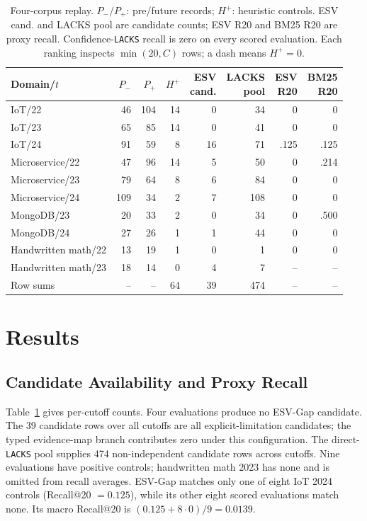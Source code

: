 \documentclass[conference,a4paper]{IEEEtran}
\begin{document}
\begin{table}[t]
\caption{Four-corpus replay. $P_-/P_+$: pre/future records; $H^+$: heuristic controls. ESV cand. and LACKS pool are candidate counts; ESV R20 and BM25 R20 are proxy recall. Confidence-\texttt{LACKS} recall is zero on every scored evaluation. Each ranking inspects $\min(20,C)$ rows; a dash means $H^+=0$.}
\label{tab:folds}
\centering\scriptsize\setlength{\tabcolsep}{2.2pt}
\begin{tabular}{lrrrrrrr}
\toprule
Domain/$t$ & $P_-$ & $P_+$ & $H^+$ & \shortstack{ESV\\cand.} & \shortstack{LACKS\\pool} & \shortstack{ESV\\R20} & \shortstack{BM25\\R20} \\
\midrule
IoT/22 & 46 & 104 & 14 & 0 & 34 & 0 & 0 \\
IoT/23 & 65 & 85 & 14 & 0 & 41 & 0 & 0 \\
IoT/24 & 91 & 59 & 8 & 16 & 71 & .125 & .125 \\
Microservice/22 & 47 & 96 & 14 & 5 & 50 & 0 & .214 \\
Microservice/23 & 79 & 64 & 8 & 6 & 84 & 0 & 0 \\
Microservice/24 & 109 & 34 & 2 & 7 & 108 & 0 & 0 \\
MongoDB/23 & 20 & 33 & 2 & 0 & 34 & 0 & .500 \\
MongoDB/24 & 27 & 26 & 1 & 1 & 44 & 0 & 0 \\
Handwritten math/22 & 13 & 19 & 1 & 0 & 1 & 0 & 0 \\
Handwritten math/23 & 18 & 14 & 0 & 4 & 7 & -- & -- \\
\midrule
Row sums & -- & -- & 64 & 39 & 474 & -- & -- \\
\bottomrule
\end{tabular}
\end{table}

\section{Results}
\subsection{Candidate Availability and Proxy Recall}
Table~\ref{tab:folds} gives per-cutoff counts. Four evaluations produce no ESV-Gap candidate. The 39 candidate rows over all cutoffs are all explicit-limitation candidates; the typed evidence-map branch contributes zero under this configuration. The direct-\texttt{LACKS} pool supplies 474 non-independent candidate rows across cutoffs. Nine evaluations have positive controls; handwritten math 2023 has none and is omitted from recall averages. ESV-Gap matches only one of eight IoT 2024 controls (Recall@20 $=0.125$), while its other eight scored evaluations match none. Its macro Recall@20 is $(0.125+8\cdot0)/9=0.0139$.
\end{document}
